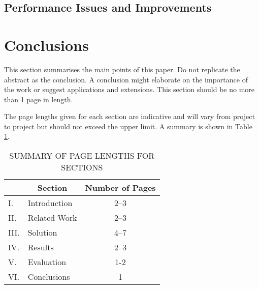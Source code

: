 \documentclass[12pt,a4paper]{article}
\begin{document}
\subsection{Performance Issues and Improvements}


\section{Conclusions}

This section summarises the main points of this paper.  Do not replicate the abstract as the conclusion.  A conclusion might elaborate on the importance of the work or suggest applications and extensions.  This section should be no more than 1 page in length.

The page lengths given for each section are indicative and will vary from project to project but should not exceed the upper limit.  A summary is shown in Table \ref{summary}.

\begin{table}[htb]
\centering
\caption{SUMMARY OF PAGE LENGTHS FOR SECTIONS}
\vspace*{6pt}
\label{summary}
\begin{tabular}{|ll|c|} \hline
& \multicolumn{1}{c|}{\bf Section} & {\bf Number of Pages} \\ \hline
I. & Introduction & 2--3 \\ \hline
II. & Related Work & 2--3 \\ \hline
III. & Solution & 4--7 \\ \hline
IV. & Results & 2--3 \\ \hline
V. & Evaluation & 1-2 \\ \hline
VI. & Conclusions & 1 \\ \hline
\end{tabular}
\end{table}



\end{document}
